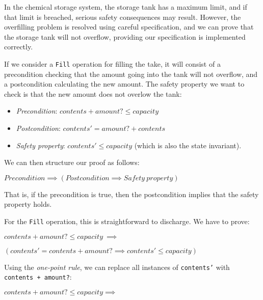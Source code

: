\begin{example}

In the chemical storage system, the storage tank has a maximum limit, and if that limit is breached, serious safety consequences may result.
However, the overfilling problem is resolved using careful specification, and we can prove that the storage tank will not overflow, providing our specification is implemented correctly.

If we consider a \texttt{Fill} operation for filling the take, it will consist of a precondition checking that the amount going into the tank will not overflow, and a postcondition calculating the new amount. The safety property we want to check is that the new amount does not overlow the tank:

\begin{itemize}

 \item \emph{Precondition}: $contents + amount? \leq capacity$

 \item \emph{Postcondition}: $contents' = amount? + contents$

 \item \emph{Safety property}: $contents' \leq capacity$ (which is also the state invariant).

\end{itemize}

We can then structure our proof as follows:

\begin{center}
$Precondition \implies (Postcondition \implies Safety\ property)$
\end{center}

That is, if the precondition is true, then the postcondition implies that the safety property holds.

For the \texttt{Fill} operation, this is straightforward to discharge. We have to prove:

\quad  $contents + amount? \leq capacity ~\implies$

\vspace{-2mm}

\quad\quad $(contents' = contents + amount? \implies contents' \leq capacity)$

Using the \emph{one-point rule}, we can replace all instances of \texttt{contents'} with \texttt{contents + amount?}: 

\quad  $contents + amount? \leq capacity \implies~$

\vspace{-2mm}


\end{example}
